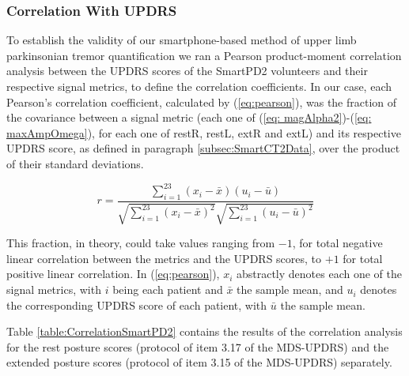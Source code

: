 \subsubsection{Correlation With UPDRS}
\label{subsubsec:SmartCT2Correlation}
To establish the validity of our smartphone-based method of upper limb parkinsonian tremor quantification we ran a Pearson product-moment correlation analysis between the \gls{UPDRS} scores of the \gls{SmartPD2} volunteers and their respective signal metrics, to define the correlation coefficients. In our case, each Pearson's correlation coefficient, calculated by (\ref{eq:pearson}), was the fraction of the covariance between a signal metric (each one of (\ref{eq: magAlpha2})-(\ref{eq: maxAmpOmega}), for each one of restR, restL, extR and extL) and its respective \gls{UPDRS} score, as defined in paragraph \ref{subsec:SmartCT2Data}, over the product of their standard deviations. 

\begin{equation} \label{eq:pearson}
r = \frac{ \sum_{i=1}^{23} (x_{i} - \bar{x})(u_{i} - \bar{u}) } 
		 { \sqrt{\sum_{i=1}^{23} (x_{i} - \bar{x})^{2}} \sqrt{\sum_{i=1}^{23} (u_{i} - \bar{u})^{2}} }
\end{equation}

\noindent
This fraction, in theory, could take values ranging from $-1$, for total negative linear correlation between the metrics and the \gls{UPDRS} scores, to $+1$ for total positive linear correlation. In (\ref{eq:pearson}), $x_{i}$ abstractly denotes each one of the signal metrics, with $i$ being each patient and $\bar{x}$ the sample mean, and $u_{i}$ denotes the corresponding \gls{UPDRS} score of each patient, with $\bar{u}$ the sample mean.

Table \ref{table:CorrelationSmartPD2} contains the results of the correlation analysis for the rest posture scores (protocol of item 3.17 of the \gls{MDS}-\gls{UPDRS}) and the extended posture scores (protocol of item 3.15 of the \gls{MDS}-\gls{UPDRS}) separately.

